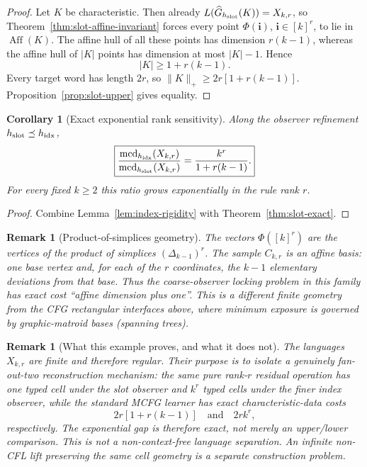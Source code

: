 \documentclass[11pt]{article}
\newtheorem{corollary}[definition]{Corollary}
\newtheorem{remark}[definition]{Remark}
\begin{document}
\begin{proof}
Let $K$ be characteristic.  Then already
$L(\widehat G_{h_{\rm slot}}(K))=X_{k,r}$, so
Theorem~\ref{thm:slot-affine-invariant} forces every point
$\Phi(\mathbf i)$, $\mathbf i\in[k]^r$, to lie in
$\operatorname{Aff}(K)$.  The affine hull of all these points has dimension
$r(k-1)$, whereas the affine hull of $|K|$ points has dimension at most
$|K|-1$.  Hence
\[
 |K|\ge1+r(k-1).
\]
Every target word has length $2r$, so
$\|K\|_+\ge2r[1+r(k-1)]$.  Proposition~\ref{prop:slot-upper} gives equality.
\end{proof}

\begin{corollary}[Exact exponential rank sensitivity]
\label{cor:exponential-rank-sensitivity}
Along the observer refinement
$h_{\rm slot}\preceq h_{\rm idx}$,
\[
 \boxed{
 \frac{\operatorname{mcd}_{h_{\rm idx}}(X_{k,r})}
      {\operatorname{mcd}_{h_{\rm slot}}(X_{k,r})}
 =
 \frac{k^r}{1+r(k-1)}.
 }
\]
For every fixed $k\ge2$ this ratio grows exponentially in the rule rank $r$.
\end{corollary}

\begin{proof}
Combine Lemma~\ref{lem:index-rigidity} with
Theorem~\ref{thm:slot-exact}.
\end{proof}

\begin{remark}[Product-of-simplices geometry]
The vectors $\Phi([k]^r)$ are the vertices of the product of simplices
$(\Delta_{k-1})^r$.  The sample $C_{k,r}$ is an affine basis: one base vertex
and, for each of the $r$ coordinates, the $k-1$ elementary deviations from
that base.  Thus the coarse-observer locking problem in this family has exact
cost ``affine dimension plus one''.  This is a different finite geometry from
the CFG rectangular interfaces above, where minimum exposure is governed by
graphic-matroid bases (spanning trees).
\end{remark}

\begin{remark}[What this example proves, and what it does not]
The languages $X_{k,r}$ are finite and therefore regular.  Their purpose is to
isolate a genuinely fan-out-two reconstruction mechanism: the same pure
rank-$r$ residual operation has one typed cell under the slot observer and
$k^r$ typed cells under the finer index observer, while the standard MCFG
learner has exact characteristic-data costs
\[
 2r[1+r(k-1)]
 \quad\text{and}\quad
 2rk^r,
\]
respectively.  The exponential gap is therefore exact, not merely an upper/lower comparison.  This is not a non-context-free language separation.  An infinite non-CFL lift preserving
the same cell geometry is a separate construction problem.
\end{remark}
\end{document}
